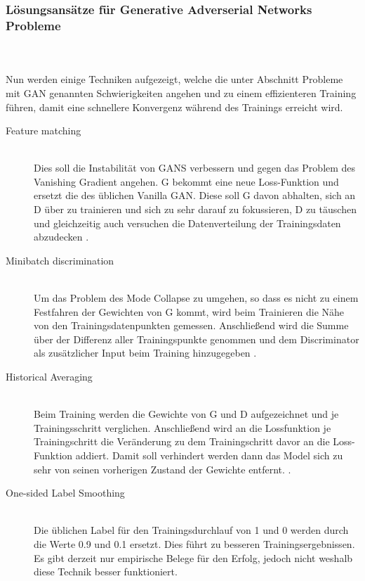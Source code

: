 \documentclass{llncs}
\begin{document}
\subsubsection{Lösungsansätze für Generative Adverserial Networks Probleme}
~\\\\
Nun werden einige Techniken aufgezeigt, welche die unter Abschnitt Probleme mit GAN genannten Schwierigkeiten angehen und zu einem effizienteren Training führen, damit eine schnellere Konvergenz während des Trainings erreicht wird.
\\
\begin{description}
\item[Feature matching]
~\\
Dies soll die Instabilität von GANS verbessern und gegen das Problem des Vanishing Gradient angehen. G bekommt eine neue Loss-Funktion und ersetzt die des üblichen Vanilla GAN. Diese soll G davon abhalten, sich an D über zu trainieren und sich zu sehr darauf zu fokussieren, D zu täuschen und gleichzeitig auch versuchen die Datenverteilung der Trainingsdaten abzudecken \cite{improvingan}.\\

\item[Minibatch discrimination] 
~\\
Um das Problem des Mode Collapse zu umgehen, so dass es nicht zu einem Festfahren der Gewichten von G kommt, wird beim Trainieren die Nähe von den Trainingsdatenpunkten gemessen. Anschließend wird die Summe über der Differenz aller Trainingspunkte genommen und dem Discriminator als zusätzlicher Input beim Training hinzugegeben \cite{improvingan}.\\

\item[Historical Averaging]
~\\
Beim Training werden die Gewichte von G und D aufgezeichnet und je Trainingsschritt verglichen. Anschließend wird an die Lossfunktion je Trainingschritt die Veränderung zu dem Trainingschritt davor an die Loss-Funktion addiert. Damit soll verhindert werden dann das Model sich zu sehr von seinen vorherigen Zustand der Gewichte entfernt. \cite{improvingan}.\\

\item[One-sided Label Smoothing]
~\\
Die üblichen Label für den Trainingsdurchlauf von 1 und 0 werden durch die Werte 0.9 und 0.1 ersetzt. Dies führt zu besseren Trainingsergebnissen. Es gibt derzeit nur empirische Belege für den Erfolg, jedoch nicht weshalb diese Technik besser funktioniert\cite{improvingan}.\\


\end{description}
\end{document}
